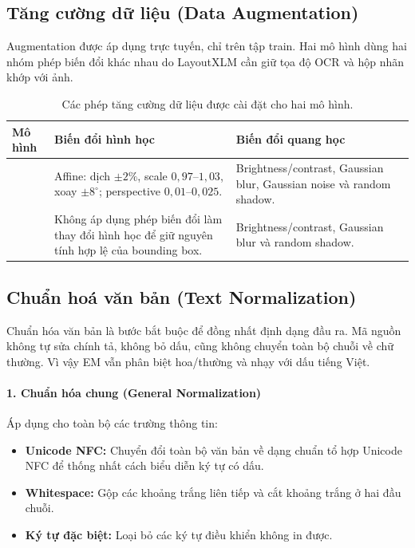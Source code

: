\subsection{Tăng cường dữ liệu (Data Augmentation)}
\label{subsec:augmentation}

Augmentation được áp dụng trực tuyến, chỉ trên tập train. Hai mô hình dùng hai nhóm phép biến đổi khác nhau do LayoutXLM cần giữ tọa độ OCR và hộp nhãn khớp với ảnh.

\begin{table}[htbp]
  \centering
  \caption{Các phép tăng cường dữ liệu được cài đặt cho hai mô hình.}
  \label{tab:augmentation}
  \begin{tabularx}{\textwidth}{lL{4.7cm}L{5.4cm}}
    \toprule
    \textbf{Mô hình} & \textbf{Biến đổi hình học} & \textbf{Biến đổi quang học} \\
    \midrule
     & Affine: dịch $\pm2\%$, scale $0,97$--$1,03$, xoay $\pm8^\circ$; perspective $0,01$--$0,025$. & Brightness/contrast, Gaussian blur, Gaussian noise và random shadow. \\
     & Không áp dụng phép biến đổi làm thay đổi hình học để giữ nguyên tính hợp lệ của bounding box. & Brightness/contrast, Gaussian blur và random shadow. \\
    \bottomrule
  \end{tabularx}
\end{table}

\subsection{Chuẩn hoá văn bản (Text Normalization)}
\label{subsec:text-normalization}

Chuẩn hóa văn bản là bước bắt buộc để đồng nhất định dạng đầu ra. Mã nguồn không tự sửa chính tả, không bỏ dấu, cũng không chuyển toàn bộ chuỗi về chữ thường. Vì vậy EM vẫn phân biệt hoa/thường và nhạy với dấu tiếng Việt.

\paragraph{1. Chuẩn hóa chung (General Normalization)}
Áp dụng cho toàn bộ các trường thông tin:
\begin{itemize}
  \item \textbf{Unicode NFC:} Chuyển đổi toàn bộ văn bản về dạng chuẩn tổ hợp Unicode NFC để thống nhất cách biểu diễn ký tự có dấu.
  \item \textbf{Whitespace:} Gộp các khoảng trắng liên tiếp và cắt khoảng trắng ở hai đầu chuỗi.
  \item \textbf{Ký tự đặc biệt:} Loại bỏ các ký tự điều khiển không in được.
\end{itemize}

